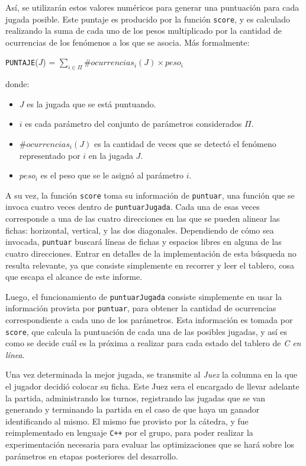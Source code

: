 \documentclass[12pt,a4paper]{article}
\begin{document}
    Así, se utilizarán estos valores numéricos para generar una puntuación para cada jugada posible. Este puntaje es producido por la función \texttt{score}, y es calculado realizando la suma de cada uno de los pesos multiplicado por la cantidad de ocurrencias de los fenómenos a los que se asocia. Más formalmente:
    
    \begin{center}
        \texttt{PUNTAJE}($J$) =  $\sum_{i \in \Pi} \#ocurrencias_{i}(J) \times peso_{i} $ 
    \end{center}
    
    donde:
    \begin{itemize}
        \item $J$ es la jugada que se está puntuando.
        \item $i$ es cada parámetro del conjunto de parámetros considerados $\Pi$.
        \item $\#ocurrencias_{i}(J)$ es la cantidad de veces que se detectó el fenómeno representado por $i$ en la jugada $J$.
        \item $peso_{i}$ es el peso que se le asignó al parámetro $i$.
    \end{itemize}

    A su vez, la función \texttt{score} toma su información de \texttt{puntuar}, una función que se invoca cuatro veces dentro de \texttt{puntuarJugada}. Cada una de esas veces corresponde a una de las cuatro direcciones en las que se pueden alinear las fichas: horizontal, vertical, y las dos diagonales. Dependiendo de cómo sea invocada, \texttt{puntuar} buscará líneas de fichas y espacios libres en alguna de las cuatro direcciones. Entrar en detalles de la implementación de esta búsqueda no resulta relevante, ya que consiste simplemente en recorrer y leer el tablero, cosa que escapa el alcance de este informe.
        
    Luego, el funcionamiento de \texttt{puntuarJugada} consiste simplemente en usar la información provista por \texttt{puntuar}, para obtener la cantidad de ocurrencias correspondiente a cada uno de los parámetros. Esta información es tomada por \texttt{score}, que calcula la puntuación de cada una de las posibles jugadas, y así es como se decide cuál es la próxima a realizar para cada estado del tablero de \textit{C en línea}.
    
    Una vez determinada la mejor jugada, se transmite al \textit{Juez} la columna en la que el jugador decidió colocar su ficha. Este Juez sera el encargado de llevar adelante la partida, administrando los turnos, registrando las jugadas que se van generando y terminando la partida en el caso de que haya un ganador identificando al mismo. El mismo fue provisto por la cátedra, y fue reimplementado en lenguaje \texttt{C++} por el grupo, para poder realizar la experimentación necesaria para evaluar las optimizaciones que se hará sobre los parámetros en etapas posteriores del desarrollo.
    
\end{document}
